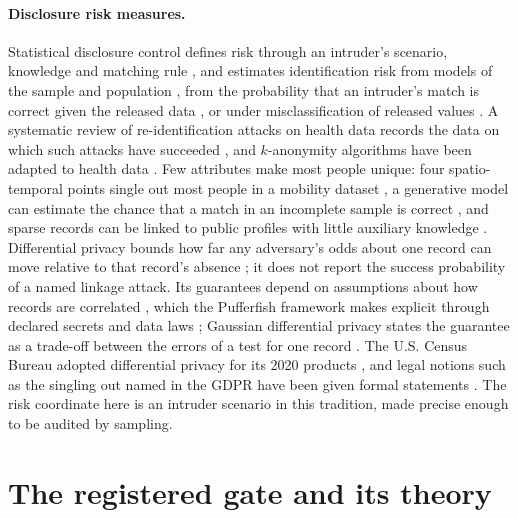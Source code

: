 \documentclass{jpc}
\theoremstyle{remark}
\begin{document}
\paragraph{Disclosure risk measures.} Statistical disclosure control defines risk through an intruder's scenario, knowledge and matching rule \cite{duncan1989,hundepool2012}, and estimates identification risk from models of the sample and population \cite{skinner2008}, from the probability that an intruder's match is correct given the released data \cite{reiter2005}, or under misclassification of released values \cite{shlomo2010}. A systematic review of re-identification attacks on health data records the data on which such attacks have succeeded \cite{elemam2011}, and $k$-anonymity algorithms have been adapted to health data \cite{elemam2008}. Few attributes make most people unique: four spatio-temporal points single out most people in a mobility dataset \cite{demontjoye2013}, a generative model can estimate the chance that a match in an incomplete sample is correct \cite{rocher2019}, and sparse records can be linked to public profiles with little auxiliary knowledge \cite{narayanan2008}. Differential privacy \cite{dwork2014} bounds how far any adversary's odds about one record can move relative to that record's absence \cite{kasiviswanathan2014}; it does not report the success probability of a named linkage attack. Its guarantees depend on assumptions about how records are correlated \cite{kifer2011}, which the Pufferfish framework makes explicit through declared secrets and data laws \cite{kifer2014}; Gaussian differential privacy states the guarantee as a trade-off between the errors of a test for one record \cite{dong2022}. The U.S. Census Bureau adopted differential privacy for its 2020 products \cite{abowd2018}, and legal notions such as the singling out named in the GDPR have been given formal statements \cite{cohen2020}. The risk coordinate here is an intruder scenario in this tradition, made precise enough to be audited by sampling.



\section{The registered gate and its theory}\label{sec:gate}
\end{document}
